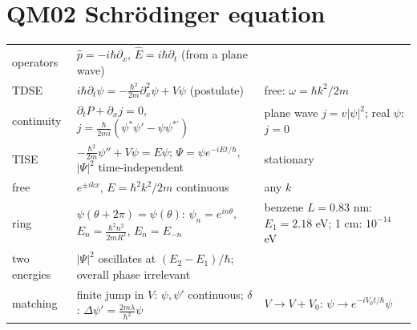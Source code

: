 \documentclass[9pt]{article}
\begin{document}
\section*{QM02 Schr\"odinger equation}
\begin{tabular}{@{}p{2.8cm}p{8.3cm}p{6.3cm}@{}}
\toprule
operators & $\hat p=-i\hbar\partial_x$, $\hat E=i\hbar\partial_t$ (from a plane wave) & \\
TDSE & $i\hbar\partial_t\psi=-\tfrac{\hbar^2}{2m}\partial_x^2\psi+V\psi$ (postulate) & free: $\omega=\hbar k^2/2m$\\
continuity & $\partial_tP+\partial_xj=0$, $j=\tfrac{\hbar}{2mi}(\psi^*\psi'-\psi\psi^{*\prime})$ & plane wave $j=v|\psi|^2$; real $\psi$: $j=0$\\
TISE & $-\tfrac{\hbar^2}{2m}\psi''+V\psi=E\psi$; $\Psi=\psi e^{-iEt/\hbar}$, $|\Psi|^2$ time-independent & stationary\\
free & $e^{\pm ikx}$, $E=\hbar^2k^2/2m$ continuous & any $k$\\
ring & $\psi(\theta+2\pi)=\psi(\theta)$: $\psi_n=e^{in\theta}$, $E_n=\tfrac{\hbar^2n^2}{2mR^2}$, $E_n=E_{-n}$ & benzene $L=0.83$ nm: $E_1=2.18$ eV; 1 cm: $10^{-14}$ eV\\
two energies & $|\Psi|^2$ oscillates at $(E_2-E_1)/\hbar$; overall phase irrelevant & \\
matching & finite jump in $V$: $\psi,\psi'$ continuous; $\delta$: $\Delta\psi'=\tfrac{2m\lambda}{\hbar^2}\psi$ & $V\to V+V_0$: $\psi\to e^{-iV_0t/\hbar}\psi$\\
\bottomrule
\end{tabular}
\end{document}
